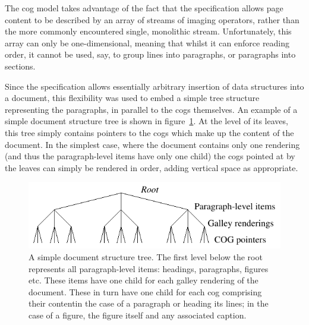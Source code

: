 The \gls{cog} model takes advantage of the fact that the \pdf{} specification \cite{Adobe2001} allows page content to be described by an array of streams of imaging operators, rather than the more commonly encountered single, monolithic stream. Unfortunately, this array can only be one-di\-men\-sional, meaning that whilst it can enforce reading order, it cannot be used, say, to group lines into paragraphs, or paragraphs into sections.

Since the \pdf{} specification allows essentially arbitrary insertion of data structures into a document,  this flexibility was used to embed a simple tree structure representing the paragraphs, in parallel to the \glspl{cog} themselves. An example of a simple document structure tree is shown in figure~\ref{fig:tree}. At the level of its leaves, this tree simply contains pointers to the \glspl{cog} which make up the content of the document. In the simplest case, where the document contains only one rendering (and thus the pa\-ra\-graph-level items have only one child) the \glspl{cog} pointed at by the leaves can simply be rendered in order, adding vertical space as appropriate.

\begin{figure}
 \includegraphics[width=\textwidth]{gfx/tree}
 \caption[A simple document structure tree]{A simple document structure tree. The first level below the root represents all paragraph-level items: headings, paragraphs, figures etc. These items have one child for each galley rendering of the document. These in turn have one child for each \gls{cog} comprising their content\ed{}in the case of a paragraph or heading its lines; in the case of a figure, the figure itself and any associated caption.}
 \label{fig:tree}
\end{figure}

